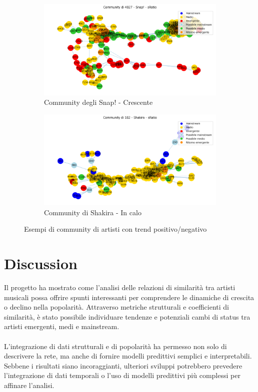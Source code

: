 \documentclass[sigchi]{acmart}
\begin{document}
\begin{figure}[H]
\centering

\begin{subfigure}{0.45\textwidth}
  \centering
  \includegraphics[width=\linewidth]{../open_problem/plots/3_4/comm4827_sRatio.png}
  \caption{Community degli Snap! - Crescente}
\end{subfigure}
\hfill
\begin{subfigure}{0.45\textwidth}
  \centering
  \includegraphics[width=\linewidth]{../open_problem/plots/3_4/comm182_sRatio.png}
  \caption{Community di Shakira - In calo}
\end{subfigure}

\caption{Esempi di community di artisti con trend positivo/negativo}
\label{fig:trendComm}
\end{figure}


\section{Discussion}
Il progetto ha mostrato come l'analisi delle relazioni di similarità tra artisti musicali possa offrire spunti interessanti per comprendere le dinamiche di crescita o declino nella popolarità. Attraverso metriche strutturali e coefficienti di similarità, è stato possibile individuare tendenze e potenziali cambi di status tra artisti emergenti, medi e mainstream. \\ \\ L'integrazione di dati strutturali e di popolarità ha permesso non solo di descrivere la rete, ma anche di fornire modelli predittivi semplici e interpretabili. Sebbene i risultati siano incoraggianti, ulteriori sviluppi potrebbero prevedere l'integrazione di dati temporali o l'uso di modelli predittivi più complessi per affinare l'analisi.



\end{document}
